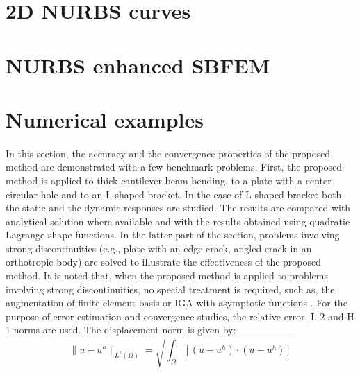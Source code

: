 \section{2D NURBS curves}
  

\section{NURBS enhanced SBFEM}








\section{Numerical examples}
\paragraph{}
In this section, the accuracy and the convergence properties of the proposed method are demonstrated with a few
    benchmark problems.
First, the proposed method is applied to thick cantilever beam bending, to a plate with a center
    circular hole and to an L-shaped bracket.
In the case of L-shaped bracket both the static and the dynamic responses are studied.
The results are compared with analytical solution where available and with the results obtained using quadratic
    Lagrange shape functions.
In the latter part of the section, problems involving strong discontinuities (e.g., plate with an edge crack,
    angled crack in an orthotropic body) are solved to illustrate the effectiveness of the proposed method.
It is noted that, when the proposed method is applied to problems involving strong discontinuities, no special 
    treatment is required, such as, the augmentation of finite element basis or IGA with asymptotic functions
    \cite{Benson2010} \cite{De2011}.
For the purpose of error estimation and convergence studies, the relative error, L 2 and H 1 norms are used.
The displacement norm is given by:
    \begin{equation}
        \| u - u^h \|_{L^2(\Omega)}=
        \sqrt{
            \int_{\Omega}\left[
                \left(
                    u-u^h
                \right) \cdot
                \left(
                    u-u^h
                \right)
            \right]
        }
    \end{equation}

